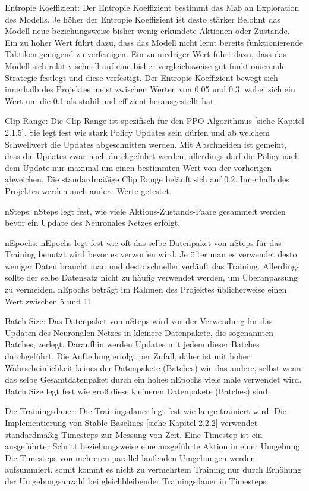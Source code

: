 Entropie Koeffizient: Der Entropie Koeffizient bestimmt das Maß an Exploration des Modells. Je höher der Entropie Koeffizient ist desto stärker Belohnt das Modell neue beziehungsweise bisher wenig erkundete Aktionen oder Zustände. Ein zu hoher Wert führt dazu, dass das Modell nicht lernt bereits funktionierende Taktiken genügend zu verfestigen. Ein zu niedriger Wert führt dazu, dass das Modell sich relativ schnell auf eine bisher vergleichsweise gut funktionierende Strategie festlegt und diese verfestigt. Der Entropie Koeffizient bewegt sich innerhalb des Projektes meist zwischen Werten von 0.05 und 0.3, wobei sich ein Wert um die 0.1 als stabil und effizient herausgestellt hat.

Clip Range: Die Clip Range ist spezifisch für den PPO Algorithmus [siehe Kapitel 2.1.5]. Sie legt fest wie stark Policy Updates sein dürfen und ab welchem Schwellwert die Updates abgeschnitten werden. Mit Abschneiden ist gemeint, dass die Updates zwar noch durchgeführt werden, allerdings darf die Policy nach dem Update nur maximal um einen bestimmten Wert von der vorherigen abweichen. Die standardmäßige Clip Range beläuft sich auf 0.2. Innerhalb des Projektes werden auch andere Werte getestet.

nSteps: nSteps legt fest, wie viele Aktions-Zustands-Paare gesammelt werden bevor ein Update des Neuronales Netzes erfolgt.

nEpochs: nEpochs legt fest wie oft das selbe Datenpaket von nSteps für das Training benutzt wird bevor es verworfen wird. Je öfter man es verwendet desto weniger Daten braucht man und desto schneller verläuft das Training. Allerdings sollte der selbe Datensatz nicht zu häufig verwendet werden, um Überanpassung zu vermeiden. nEpochs beträgt im Rahmen des Projektes üblicherweise einen Wert zwischen 5 und 11.

Batch Size: Das Datenpaket von nSteps wird vor der Verwendung für das Updaten des Neuronalen Netzes in kleinere Datenpakete, die sogenannten Batches, zerlegt. Daraufhin werden Updates mit jedem dieser Batches durchgeführt. Die Aufteilung erfolgt per Zufall, daher ist mit hoher Wahrscheinlichkeit keines der Datenpakete (Batches) wie das andere, selbst wenn das selbe Gesamtdatenpaket durch ein hohes nEpochs viele male verwendet wird. Batch Size legt fest wie groß diese kleineren Datenpakete (Batches) sind.

Die Trainingsdauer: Die Trainingsdauer legt fest wie lange trainiert wird. Die Implementierung von Stable Baselines [siehe Kapitel 2.2.2] verwendet standardmäßig Timesteps zur Messung von Zeit. Eine Timestep ist ein ausgeführter Schritt beziehungsweise eine ausgeführte Aktion in einer Umgebung. Die Timesteps von mehreren parallel laufenden Umgebungen werden aufsummiert, somit kommt es nicht zu vermehrtem Training nur durch Erhöhung der Umgebungsanzahl bei gleichbleibender Trainingsdauer in Timesteps.